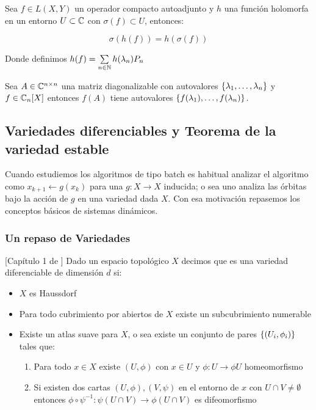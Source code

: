 \begin{proposition}
	\label{prop: calculo funcional}
	
	Sea $f \in L(X,Y)$ un operador compacto autoadjunto y $h$ una funci\'on holomorfa en un entorno $U \subset \mathbb{C}$ con $\sigma(f) \subset U$, entonces:
	
	\begin{equation*}
		\sigma \left(h(f)\right) = h(\sigma(f))
	\end{equation*}
	
	Donde definimos $h(f) = \sum\limits_{n \in {\mathbb{N}}}{h(\lambda_n) P_n}$
	
\end{proposition}

\begin{corollary}
	Sea $A \in \mathbb{C}^{n \times n}$ una matriz diagonalizable con autovalores $\left\lbrace\lambda_1, \dots, \lambda_n\right\rbrace$ y $f \in \mathbb{C}_n[X]$ entonces $f(A)$ tiene autovalores $\left\lbrace f(\lambda_1), \dots, f(\lambda_n)\right\rbrace$.
\end{corollary}

\subsection{Variedades diferenciables y Teorema de la variedad estable}

Cuando estudiemos los algoritmos de tipo batch es habitual analizar el algoritmo como $x_{k+1} \gets g(x_k)$ para una $g : X \rightarrow X$ inducida; o sea uno analiza las \'orbitas bajo la acci\'on de $g$ en una variedad dada $X$. Con esa motivaci\'on repasemos los conceptos b\'asicos de sistemas din\'amicos.

\subsubsection{Un repaso de Variedades}

\begin{definition}{[Cap\'itulo 1 de \cite{lee:00}]}
	Dado un espacio topol\'ogico $X$ decimos que es una variedad diferenciable de dimensi\'on $d$ si:
	
	\begin{itemize}
		\item $X$ es Haussdorf
		\item Para todo cubrimiento por abiertos de $X$ existe un subcubrimiento numerable
		\item Existe un atlas suave para $X$, o sea existe un conjunto de pares $\left\lbrace\left(U_i, \phi_i\right)\right\rbrace$ tales que:
		
		\begin{enumerate}
			\item Para todo $x \in X$ existe $(U,\phi)$ con $x \in U$ y $\phi: U \rightarrow \phi{U}$ homeomorfismo
			\item Si existen dos cartas $(U,\phi), (V,\psi)$ en el entorno de $x$ con $U \cap V \neq \emptyset$ entonces $\phi \circ \psi^{-1} : \psi(U\cap V )\rightarrow \phi(U\cap V)$ es difeomorfismo
		\end{enumerate}
	\end{itemize}
	
\end{definition}

